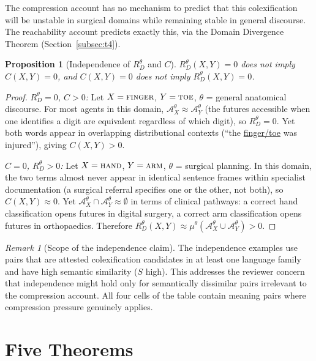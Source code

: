 \documentclass[12pt]{article}
\theoremstyle{rthm}
\newtheorem{proposition}[theorem]{Proposition}
\theoremstyle{rdef}
\theoremstyle{remark}
\newtheorem*{remark}{Remark}
\newcommand{\A}{\mathcal{A}}
\newcommand{\RD}[1][\theta]{R_{D}^{#1}}
\begin{document}
The compression account has no mechanism to predict that this colexification
will be unstable in surgical domains while remaining stable in general discourse.
The reachability account predicts exactly this, via the Domain Divergence Theorem
(Section~\ref{subsec:t4}).

\begin{proposition}[Independence of $\RD$ and $C$]
\label{prop:independence}
$\RD[\theta](X,Y) = 0$ does not imply $C(X,Y) = 0$, and $C(X,Y) = 0$ does
not imply $\RD[\theta](X,Y) = 0$.
\end{proposition}

\begin{proof}
\emph{$\RD = 0$, $C > 0$:} Let $X = \textsc{finger}$, $Y = \textsc{toe}$,
$\theta$ = general anatomical discourse. For most agents in this domain,
$\A_X^{\theta} \approx \A_Y^{\theta}$ (the futures accessible when one
identifies a digit are equivalent regardless of which digit), so $\RD[\theta] = 0$.
Yet both words appear in overlapping distributional contexts
(``the \underline{finger/toe} was injured''), giving $C(X,Y) > 0$.

\emph{$C = 0$, $\RD > 0$:} Let $X = \textsc{hand}$, $Y = \textsc{arm}$,
$\theta$ = surgical planning. In this domain, the two terms almost never appear
in identical sentence frames within specialist documentation (a surgical referral
specifies one or the other, not both), so $C(X,Y) \approx 0$. Yet
$\A_X^{\theta} \cap \A_Y^{\theta} \approx \emptyset$ in terms of clinical
pathways: a correct hand classification opens futures in digital surgery, a
correct arm classification opens futures in orthopaedics. Therefore
$\RD[\theta](X,Y) \approx \mu^{\theta}(\A_X^{\theta} \cup \A_Y^{\theta}) > 0$.
\end{proof}

\begin{remark}[Scope of the independence claim]
The independence examples use pairs that are attested colexification candidates
in at least one language family and have high semantic similarity ($S$ high).
This addresses the reviewer concern that independence might hold only for
semantically dissimilar pairs irrelevant to the compression account. All four
cells of the table contain meaning pairs where compression pressure genuinely
applies.
\end{remark}

\section{Five Theorems}
\label{sec:theorems}
\end{document}
